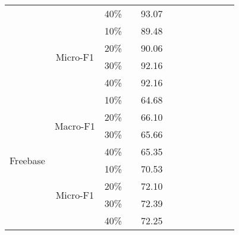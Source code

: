 \begin{table*}[!htbp]
\begin{tabular}{|c|c|c||c|c|c|c|c||c|c|c|c|}
                          &                           & 40\%     &          &   93.07      &     &     &     &        &        &        &        \\ \cline{2-12} 
                          & \multirow{4}{*}{Micro-F1} & 10\%     &          &   89.48      &     &     &     &        &        &        &        \\
                          &                           & 20\%     &          &   90.06      &     &     &     &        &        &        &        \\
                          &                           & 30\%     &          &   92.16      &     &     &     &        &        &        &        \\
                          &                           & 40\%     &          &   92.16      &     &     &     &        &        &        &        \\ \hline
\multirow{8}{*}{Freebase} & \multirow{4}{*}{Macro-F1} & 10\%     &          &   64.68      &     &     &     &        &        &        &        \\
                          &                           & 20\%     &          &   66.10      &     &     &     &        &        &        &        \\
                          &                           & 30\%     &          &   65.66      &     &     &     &        &        &        &        \\
                          &                           & 40\%     &          &   65.35      &     &     &     &        &        &        &        \\ \cline{2-12} 
                          & \multirow{4}{*}{Micro-F1} & 10\%     &          &   70.53      &     &     &     &        &        &        &        \\
                          &                           & 20\%     &          &   72.10      &     &     &     &        &        &        &        \\
                          &                           & 30\%     &          &   72.39      &     &     &     &        &        &        &        \\
                          &                           & 40\%     &          &   72.25      &     &     &     &        &        &        &        \\ \hline
\end{tabular}
\end{table*}

